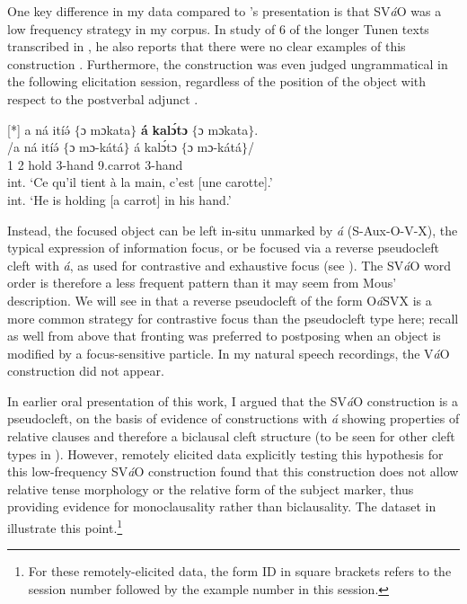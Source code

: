 \documentclass[output=paper,colorlinks,citecolor=brown
]{langscibook}
\begin{document}
One key difference in my data compared to \citeauthor{Mous2003}'s \citeyearpar{Mous2003} presentation is that SV\textit{á}O was a low frequency strategy in my corpus. In  study of 6 of the longer Tunen texts transcribed in \citet{Dugast1975}, he also reports that there were no clear examples of this construction \citep[61]{Isaac2007}. Furthermore, the construction was even judged ungrammatical in the following elicitation session, regardless of the position of the object with respect to the postverbal adjunct .



\ea
[*]{
\label{SVáOcarrotset}
\glll
{\db}a ná itíə́ $\{$ɔ mɔkata$\}$ \textbf{á} \textbf{kalɔ́tɔ} $\{$ɔ mɔkata$\}$. \\
/a ná itíə́ $\{$ɔ mɔ-kátá$\}$ á kalɔ́tɔ $\{$ɔ mɔ-kátá$\}$/ \\
{\db}1\SM{} \PST{}2{} hold \PREP{} 3-hand \COP{} 9.carrot \PREP{} 3-hand \\
\glt
int. `Ce qu'il tient à la main, c'est [une carotte]\textsubscript{\FOC{}}.' \\ int. `He is holding [a carrot]\textsubscript{\FOC{}} in his hand.' \jambox*{[JO 1627--8] }
}

\z


Instead, the focused object can be left in-situ unmarked by \textit{á} (S-Aux-O-V-X), the typical expression of information focus, or be focused via a reverse pseudocleft cleft with \textit{á}, as used for contrastive and exhaustive focus (see ). The SV\textit{á}O word order is therefore a less frequent pattern than it may seem from Mous' description. We will see in  that a reverse pseudocleft of the form O\textit{á}SVX is a more common strategy for contrastive focus than the pseudocleft type here; recall as well from  above that fronting was preferred to postposing when an object is modified by a focus-sensitive particle. In my natural speech recordings, the V\textit{á}O construction did not appear.

In earlier oral presentation of this work, I argued that the SV\textit{á}O construction is a pseudocleft, on the basis of evidence of constructions with \textit{á} showing properties of relative clauses and therefore a biclausal cleft structure (to be seen for other cleft types in ). However, remotely elicited data explicitly testing this hypothesis for this low-frequency SV\textit{á}O construction found that this construction does not allow relative tense morphology or the relative form of the subject marker, thus providing evidence for monoclausality rather than biclausality. The dataset in  illustrate this point.\footnote{For these remotely-elicited data, the form ID in square brackets refers to the session number followed by the example number in this session.}
\end{document}
